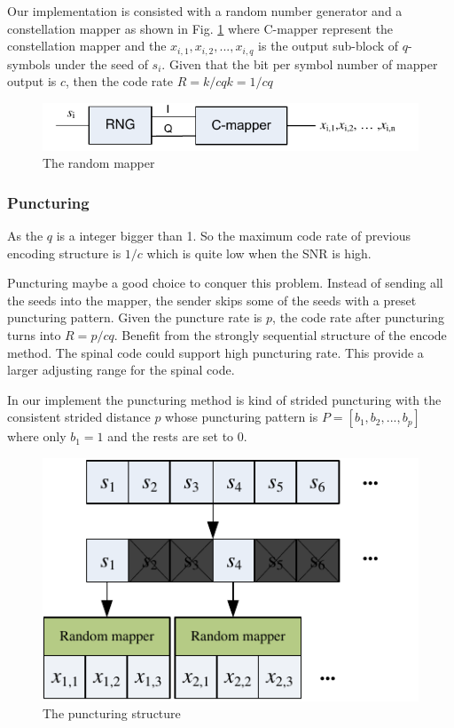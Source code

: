 \documentclass[conference]{IEEEtran}
\begin{document}
Our implementation is consisted with a random number generator and a constellation mapper as shown in Fig. \ref{fig_mapper} where C-mapper represent the constellation mapper and the $x_{i,1},x_{i,2},...,x_{i,q}$ is the output sub-block of $q$-symbols  under the seed of  $s_i$. Given that the bit per symbol number of mapper output is $c$, then the code rate $R=k/cqk=1/cq$
\begin{figure}[!t]
\centering
\includegraphics[width=3 in]{mapper.pdf}
\caption{The random mapper}
\label{fig_mapper}
\end{figure}
\subsubsection{Puncturing}
As the $q$ is a integer bigger than 1. So the maximum code rate of previous encoding structure is $1/c$ which is quite low when the SNR is high. 

Puncturing maybe a good choice to conquer this problem. Instead of sending all the seeds into the mapper, the sender skips some of the seeds with a preset puncturing pattern. Given the puncture rate is $p$, the code rate after puncturing turns into $R=p/cq$.
Benefit from the strongly sequential structure of the encode method. The spinal code could support high puncturing rate. This provide a larger adjusting range for the spinal code.

In our implement the puncturing method is kind of strided puncturing with the consistent strided distance $p$ whose puncturing pattern is $P=[b_1,b_2,...,b_p]$ where only $b_1=1$ and the rests are set to 0. 
\begin{figure}[!t]
\centering
\includegraphics[width=3 in]{punturing.pdf}
\caption{The puncturing structure}
\label{fig_puncturing}
\end{figure}
\end{document}
